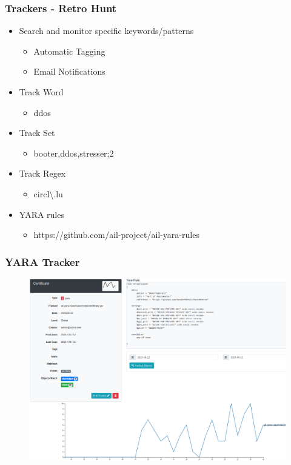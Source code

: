 \documentclass[aspectratio=169]{beamer}
\begin{document}
\begin{frame}
    \frametitle{Trackers - Retro Hunt}
        \begin{itemize}
        	\item Search and monitor specific keywords/patterns
        	\begin{itemize}
            	\item Automatic Tagging
            	\item Email Notifications
            \end{itemize}
            \item Track Word
            \begin{itemize}
            	\item ddos
            \end{itemize}
            \item Track Set
            \begin{itemize}
            	\item booter,ddos,stresser;2
            \end{itemize}
            \item Track Regex
            \begin{itemize}
            	\item circl\textbackslash.lu
            \end{itemize}
            \item YARA rules
            	\begin{itemize}
            	\item https://github.com/ail-project/ail-yara-rules
            \end{itemize}
        \end{itemize}
\end{frame}

\begin{frame}
    \frametitle{YARA Tracker}
        \begin{figure}
            \includegraphics[scale=0.22]{screenshot/tracker_yara.png}
        \end{figure}
\end{frame}
\end{document}
